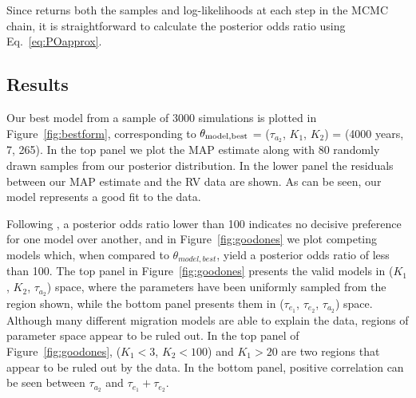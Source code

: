 Since \emcee returns both the samples and log-likelihoods at each step in the MCMC chain, it is straightforward to calculate the posterior odds ratio using Eq.~\ref{eq:POapprox}. 


\subsection{Results}
\label{sec:formresults}

Our best model from a sample of 3000 simulations is plotted in Figure~\ref{fig:bestform}, corresponding to $\theta_{\rm model, best}$ = ($\tau_{a_2}$, $K_1$, $K_2$) = (4000 years, 7, 265).
In the top panel we plot the MAP estimate along with 80 randomly drawn samples from our posterior distribution.
In the lower panel the residuals between our MAP estimate and the RV data are shown. 
As can be seen, our model represents a good fit to the data. 

Following \citet{Kass1995}, a posterior odds ratio lower than 100 indicates no decisive preference for one model over another, and in Figure~\ref{fig:goodones} we plot competing models which, when compared to $\theta_{model,best}$, yield a posterior odds ratio of less than 100. 
The top panel in Figure~\ref{fig:goodones} presents the valid models in ($K_1$, $K_2$, $\tau_{a_2}$) space, where the parameters have been uniformly sampled from the region shown, while the bottom panel presents them in ($\tau_{e_1}$, $\tau_{e_2}$, $\tau_{a_2}$) space. 
Although many different migration models are able to explain the data, regions of parameter space appear to be ruled out.
In the top panel of Figure~\ref{fig:goodones}, ($K_1 < 3$, $K_2 < 100$) and $K_1 > 20$ are two regions that appear to be ruled out by the data. 
In the bottom panel, positive correlation can be seen between $\tau_{a_2}$ and $\tau_{e_1} + \tau_{e_2}$.

